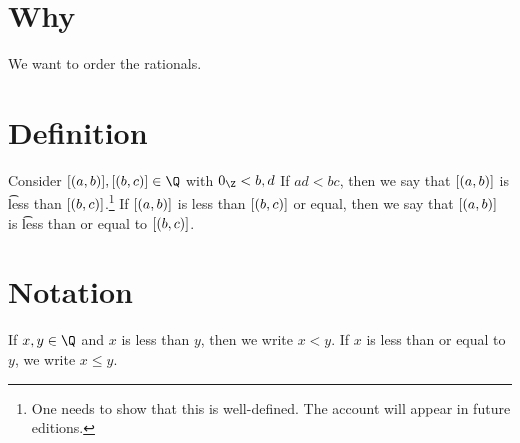 

\section*{Why}

We want to order the rationals.

\section*{Definition}

Consider $\eqc{(a, b)}, \eqc{(b, c)} \in \Q $ with $0_{\Z } < b, d$
If $ad < bc$, then we say that $[(a, b)]$ is \t{less than} $[(b, c)]$.\footnote{One needs to show that this is well-defined. The account will appear in future editions.}
If $[(a, b)]$ is less than $[(b, c)]$ or equal, then we say that $[(a, b)]$ is \t{less than or equal to} $[(b, c)]$.

\section*{Notation}

If $x, y \in \Q $ and $x$ is less than $y$, then we write $x < y$.
If $x$ is less than or equal to $y$, we write $x \leq y$.

\blankpage